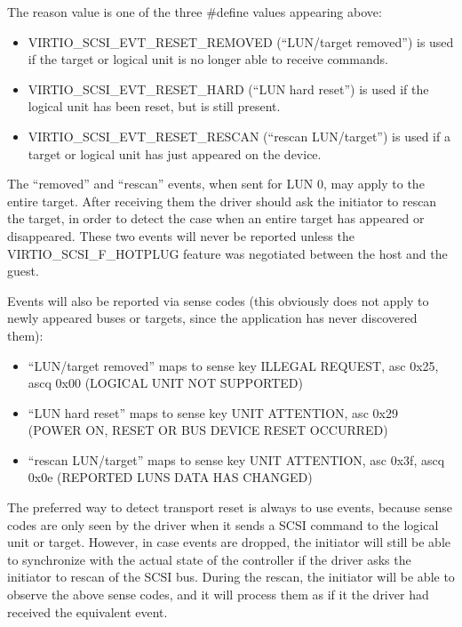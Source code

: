   The reason value is one of the three \#define values appearing
  above:

\begin{itemize}
  \item VIRTIO_SCSI_EVT_RESET_REMOVED (“LUN/target removed”) is used
    if the target or logical unit is no longer able to receive
    commands.

  \item VIRTIO_SCSI_EVT_RESET_HARD (“LUN hard reset”) is used if the
    logical unit has been reset, but is still present.

  \item VIRTIO_SCSI_EVT_RESET_RESCAN (“rescan LUN/target”) is used if
    a target or logical unit has just appeared on the device.
\end{itemize}

  The “removed” and “rescan” events, when sent for LUN 0, may
  apply to the entire target. After receiving them the driver
  should ask the initiator to rescan the target, in order to
  detect the case when an entire target has appeared or
  disappeared. These two events will never be reported unless the
  VIRTIO_SCSI_F_HOTPLUG feature was negotiated between the host
  and the guest.

  Events will also be reported via sense codes (this obviously
  does not apply to newly appeared buses or targets, since the
  application has never discovered them):

\begin{itemize}
  \item “LUN/target removed” maps to sense key ILLEGAL REQUEST, asc
    0x25, ascq 0x00 (LOGICAL UNIT NOT SUPPORTED)

  \item “LUN hard reset” maps to sense key UNIT ATTENTION, asc 0x29
    (POWER ON, RESET OR BUS DEVICE RESET OCCURRED)

  \item “rescan LUN/target” maps to sense key UNIT ATTENTION, asc
    0x3f, ascq 0x0e (REPORTED LUNS DATA HAS CHANGED)
\end{itemize}

  The preferred way to detect transport reset is always to use
  events, because sense codes are only seen by the driver when it
  sends a SCSI command to the logical unit or target. However, in
  case events are dropped, the initiator will still be able to
  synchronize with the actual state of the controller if the
  driver asks the initiator to rescan of the SCSI bus. During the
  rescan, the initiator will be able to observe the above sense
  codes, and it will process them as if it the driver had
  received the equivalent event.

